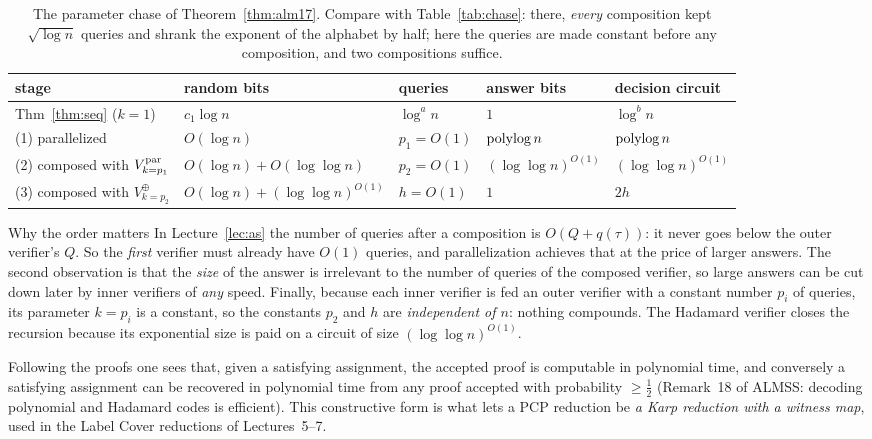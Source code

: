\begin{table}[t]
\centering\small
\renewcommand{\arraystretch}{1.25}
\begin{tabular}{@{}l>{\raggedright\arraybackslash}p{3.2cm}lll@{}}
\toprule
stage & random bits & queries & answer bits & decision circuit\\
\midrule
Thm~\ref{thm:seq} ($k=1$) & $c_1\log n$ & $\log^an$ & $1$ & $\log^bn$\\
(1) parallelized & $O(\log n)$ & $p_1=O(1)$ & $\operatorname{polylog} n$ & $\operatorname{polylog} n$\\
(2) composed with $V^{\rm par}_{k=p_1}$ & $O(\log n)+O(\log\log n)$ & $p_2=O(1)$ & $(\log\log n)^{O(1)}$ & $(\log\log n)^{O(1)}$\\
(3) composed with $V^\oplus_{k=p_2}$ & $O(\log n)+(\log\log n)^{O(1)}$ & $h=O(1)$ & $1$ & $2h$\\
\bottomrule
\end{tabular}
\caption{The parameter chase of Theorem~\ref{thm:alm17}.  Compare with Table~\ref{tab:chase}: there, \emph{every} composition kept $\sqrt{\log n}$ queries and shrank the exponent of the alphabet by half; here the queries are made constant before any composition, and two compositions suffice.}
\label{tab:alm-chase}
\end{table}

\begin{bigpicture}{Why the order matters}
In Lecture~\ref{lec:as} the number of queries after a composition is $O(Q+q(\tau))$: it never goes below the outer verifier's $Q$.  So the \emph{first} verifier must already have $O(1)$ queries,
and parallelization achieves that at the price of larger answers.  The second observation is that the \emph{size} of the answer is irrelevant to the number of queries of the composed verifier, so large answers can be cut down later by inner verifiers of \emph{any} speed.
Finally, because each inner verifier is fed an outer verifier with a constant number $p_i$ of queries, its parameter $k=p_i$ is a constant, so the constants $p_2$ and $h$ are \emph{independent of $n$}: nothing compounds.
The Hadamard verifier closes the recursion because its exponential size is paid on a circuit of size $(\log\log n)^{O(1)}$.
\end{bigpicture}

\begin{remark}[Constructivity]
Following the proofs one sees that, given a satisfying assignment, the accepted proof is computable in polynomial time, and conversely a satisfying assignment can be recovered in polynomial time from any proof accepted with probability $\ge\tfrac12$ (Remark~18 of ALMSS: decoding polynomial and Hadamard codes is efficient).
This constructive form is what lets a PCP reduction be \emph{a Karp reduction with a witness map}, used in the Label Cover reductions of Lectures~5--7.
\end{remark}

